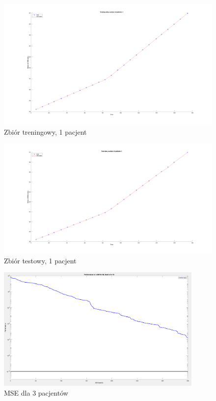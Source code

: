 \documentclass[12pt]{article}
\begin{document}
\begin{figure}[h!]

\includegraphics[width=1.05\textwidth]{training-normal-1.png}
\caption{Zbiór treningowy, 1 pacjent}

\end{figure}

\begin{figure}[h!]

\includegraphics[width=1.05\textwidth]{test-normal-1.png}
\caption{Zbiór testowy, 1 pacjent}

\end{figure}

\begin{figure}[h!]

\centering
\includegraphics[width=0.9\textwidth]{mse-normal-3.png}
\caption{MSE dla 3 pacjentów}

\end{figure}
\end{document}

